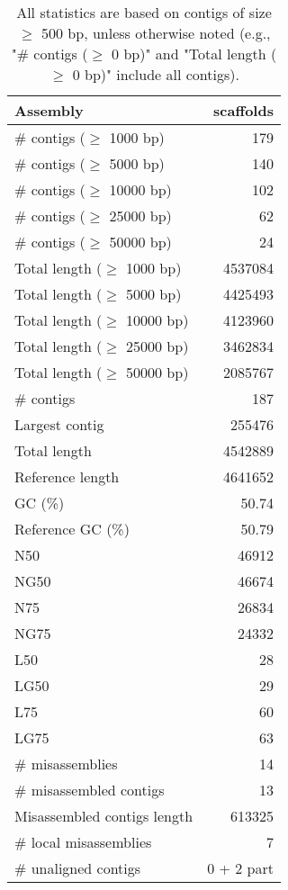 \documentclass[12pt,a4paper]{article}
\begin{document}
\begin{table}[ht]
\begin{center}
\caption{All statistics are based on contigs of size $\geq$ 500 bp, unless otherwise noted (e.g., "\# contigs ($\geq$ 0 bp)" and "Total length ($\geq$ 0 bp)" include all contigs).}
\begin{tabular}{|l*{1}{|r}|}
\hline
Assembly & scaffolds \\ \hline
\# contigs ($\geq$ 1000 bp) & 179 \\ \hline
\# contigs ($\geq$ 5000 bp) & 140 \\ \hline
\# contigs ($\geq$ 10000 bp) & 102 \\ \hline
\# contigs ($\geq$ 25000 bp) & 62 \\ \hline
\# contigs ($\geq$ 50000 bp) & 24 \\ \hline
Total length ($\geq$ 1000 bp) & 4537084 \\ \hline
Total length ($\geq$ 5000 bp) & 4425493 \\ \hline
Total length ($\geq$ 10000 bp) & 4123960 \\ \hline
Total length ($\geq$ 25000 bp) & 3462834 \\ \hline
Total length ($\geq$ 50000 bp) & 2085767 \\ \hline
\# contigs & 187 \\ \hline
Largest contig & 255476 \\ \hline
Total length & 4542889 \\ \hline
Reference length & 4641652 \\ \hline
GC (\%) & 50.74 \\ \hline
Reference GC (\%) & 50.79 \\ \hline
N50 & 46912 \\ \hline
NG50 & 46674 \\ \hline
N75 & 26834 \\ \hline
NG75 & 24332 \\ \hline
L50 & 28 \\ \hline
LG50 & 29 \\ \hline
L75 & 60 \\ \hline
LG75 & 63 \\ \hline
\# misassemblies & 14 \\ \hline
\# misassembled contigs & 13 \\ \hline
Misassembled contigs length & 613325 \\ \hline
\# local misassemblies & 7 \\ \hline
\# unaligned contigs & 0 + 2 part \\ \hline

\end{tabular}
\end{center}
\end{table}
\end{document}
